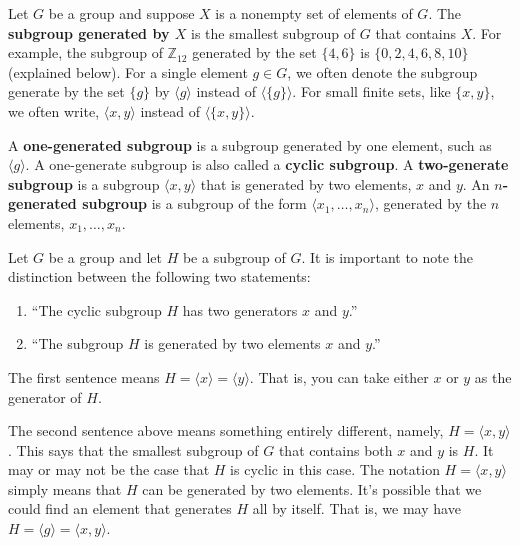 \documentclass[12pt]{article}
\newcommand{\Z} {{\mathbb Z}}
\newcommand{\<}{\ensuremath{\langle}}
\renewcommand{\>}{\ensuremath{\rangle}}
\theoremstyle{plain}
\theoremstyle{definition}
\begin{document}
Let $G$ be a group and suppose $X$ is a nonempty set of elements of $G$.
The {\bf subgroup generated by $X$} is the smallest subgroup of $G$ that
contains $X$.  
For example, the subgroup of $\Z_{12}$ generated by the set $\{4, 6\}$ is 
$\{0, 2, 4, 6, 8, 10\}$ (explained below).
For a single element $g \in G$, we often denote the subgroup generate
by the set $\{g\}$ by $\<g\>$ instead of $\<\{g\}\>$.  
For small finite sets, like $\{x, y\}$, we often write, 
$\<x, y\>$ instead of $\<\{x, y\}\>$.

A {\bf one-generated subgroup} is a subgroup generated by one
element, such as $\<g\>$.  A one-generate subgroup is also called a {\bf cyclic
subgroup}.  A {\bf two-generate subgroup} is a
subgroup $\<x, y\>$ that is generated by two elements, $x$ and $y$.
An {\bf $n$-generated subgroup} is a
subgroup of the form $\<x_1, \dots, x_n\>$, generated by the $n$ elements,
$x_1, \dots, x_n$.

Let $G$ be a group and let $H$ be a subgroup of $G$.
It is important to note the distinction between the following two statements:
\begin{enumerate}
\item ``The cyclic subgroup $H$ has two generators $x$ and $y$.''
\item ``The subgroup $H$ is generated by two elements $x$ and $y$.''
\end{enumerate}
The first sentence means $H = \<x\> = \<y\>$.  That is, you can take either $x$
or $y$ as the generator of $H$.  

The second sentence above means something entirely
different, namely, $H = \<x, y\>$.  This says that the smallest subgroup of $G$
that contains both $x$ and $y$ is $H$.  It may or may not be the case that $H$
is cyclic in this case.  The notation $H = \<x, y\>$ simply means that $H$ can
be generated by two elements.  It's possible that we could find
an element that generates $H$ all by itself.  That is, we
may have $H = \<g\> = \<x, y\>$.  

\bigskip
\end{document}
